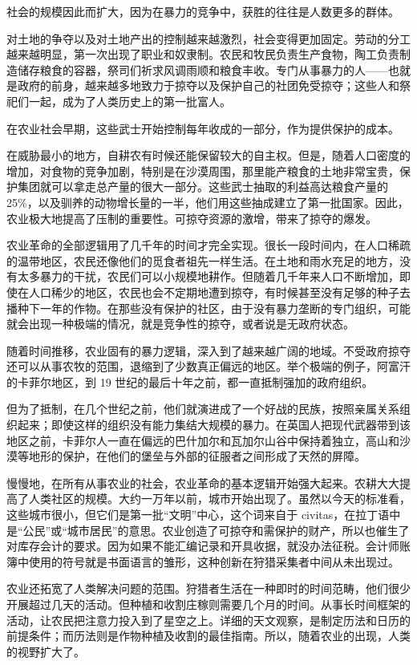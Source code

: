 社会的规模因此而扩大，因为在暴力的竞争中，获胜的往往是人数更多的群体。

对土地的争夺以及对土地产出的控制越来越激烈，社会变得更加固定。劳动的分工越来越明显，第一次出现了职业和奴隶制。农民和牧民负责生产食物，陶工负责制造储存粮食的容器，祭司们祈求风调雨顺和粮食丰收。专门从事暴力的人——也就是政府的前身，越来越多地致力于掠夺以及保护自己的社团免受掠夺；这些人和祭祀们一起，成为了人类历史上的第一批富人。

在农业社会早期，这些武士开始控制每年收成的一部分，作为提供保护的成本。

在威胁最小的地方，自耕农有时候还能保留较大的自主权。但是，随着人口密度的增加，对食物的竞争加剧，特别是在沙漠周围，那里能产粮食的土地非常宝贵，保护集团就可以拿走总产量的很大一部分。这些武士抽取的利益高达粮食产量的25\%，以及驯养的动物增长量的一半，他们用这些抽成建立了第一批国家。因此，农业极大地提高了压制的重要性。可掠夺资源的激增，带来了掠夺的爆发。

农业革命的全部逻辑用了几千年的时间才完全实现。很长一段时间内，在人口稀疏的温带地区，农民还像他们的觅食者祖先一样生活。在土地和雨水充足的地方，没有太多暴力的干扰，农民们可以小规模地耕作。但随着几千年来人口不断增加，即使在人口稀少的地区，农民也会不定期地遭到掠夺，有时候甚至没有足够的种子去播种下一年的作物。在那些没有保护的社区，由于没有暴力垄断的专门组织，可能就会出现一种极端的情况，就是竞争性的掠夺，或者说是无政府状态。

随着时间推移，农业固有的暴力逻辑，深入到了越来越广阔的地域。不受政府掠夺还可以从事农牧的范围，退缩到了少数真正偏远的地区。举个极端的例子，阿富汗的卡菲尔地区，到 19 世纪的最后十年之前，都一直抵制强加的政府组织。

但为了抵制，在几个世纪之前，他们就演进成了一个好战的民族，按照亲属关系组织起来；即使这样的组织没有能力集结大规模的暴力。在英国人把现代武器带到该地区之前，卡菲尔人一直在偏远的巴什加尔和瓦加尔山谷中保持着独立，高山和沙漠等地形的保护，在他们的堡垒与外部的征服者之间形成了天然的屏障。

慢慢地，在所有从事农业的社会，农业革命的基本逻辑开始强大起来。农耕大大提高了人类社区的规模。大约一万年以前，城市开始出现了。虽然以今天的标准看，这些城市很小，但它们是第一批“文明”中心，这个词来自于 civitas，在拉丁语中是“公民”或“城市居民”的意思。农业创造了可掠夺和需保护的财产，所以也催生了对库存会计的要求。因为如果不能汇编记录和开具收据，就没办法征税。会计师账簿中使用的符号就是书面语言的雏形，这种创新在狩猎采集者中间从未出现过。

农业还拓宽了人类解决问题的范围。狩猎者生活在一种即时的时间范畴，他们很少开展超过几天的活动。但种植和收割庄稼则需要几个月的时间。从事长时间框架的活动，让农民把注意力投入到了星空之上。详细的天文观察，是制定历法和日历的前提条件；而历法则是作物种植及收割的最佳指南。所以，随着农业的出现，人类的视野扩大了。

